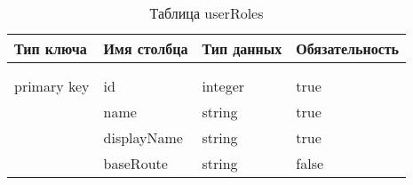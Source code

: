 \begin{xltabular}{\textwidth}{|l|l|p{1.7cm}|X|}
	\caption{Таблица userRoles \label{userRoles:table}}\\ \hline
	\centrow Тип ключа & \centrow Имя столбца & \centrow Тип данных & \centrow Обязательность \\ \hline
	 &  &  &  \\ \hline
	\endfirsthead
	 &  &  &  \\ \hline
	\finishhead
	primary key & id & integer & true \\ \hline 
	& name & string & true \\ \hline 
	& displayName & string & true \\ \hline 
	& baseRoute & string & false \\ \hline
\end{xltabular}


